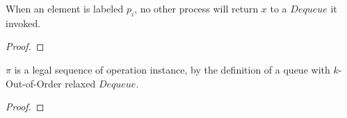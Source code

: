 \documentclass[a4paper,anonymous,USenglish]{lipics-v2021} %
\theoremstyle{definition}
\begin{document}
\begin{lemma}
  When an element is labeled $p_i$, no other process will return $x$ to a $Dequeue$ it invoked.
\end{lemma}

\begin{proof}

\end{proof}

\begin{lemma}
  $\pi$ is a legal sequence of operation instance, by the definition of a queue with $k$-Out-of-Order relaxed $Dequeue$.
\end{lemma}

\begin{proof}

\end{proof}


\end{document}
